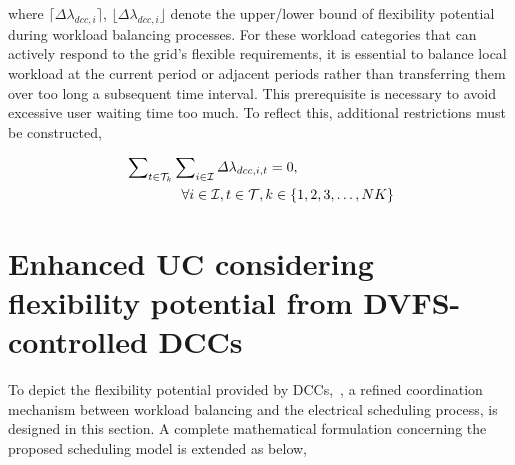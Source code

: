\documentclass[lettersize,journal]{IEEEtran}
\begin{document}
\noindent
where $\lceil {\varDelta \lambda_{dcc,i}} \rceil$, $\lfloor {\varDelta \lambda_{dcc,i}} \rfloor$ denote the upper/lower bound of flexibility potential during workload balancing processes.
For these workload categories that can actively respond to the grid's flexible requirements, it is essential to balance local workload at the current period or adjacent periods rather than transferring them over too long a subsequent time interval. This prerequisite is necessary to avoid excessive user waiting time too much. To reflect this, additional restrictions must be constructed,

\vspace{-0.25cm}
\begin{subequations}
	\begin{align}
		 & \sum\nolimits_{t\in\mathcal{T}_{k}}\sum\nolimits_{i\in\mathcal{I}} \varDelta \lambda_{dcc,i,t} = 0, \notag \\
		 & \qquad \qquad \forall i\in \mathcal{I}, t\in\mathcal{T}, k\in\{1,2,3,\ldots, NK\}
	\end{align}
\end{subequations}


\section{Enhanced UC considering flexibility potential from DVFS-controlled DCCs}


To depict the flexibility potential provided by DCCs,~\cite{zhang2017chance}, a refined coordination mechanism between workload balancing and the electrical scheduling process, is designed in this section. A complete mathematical formulation concerning the proposed scheduling model is extended as below,
\end{document}
